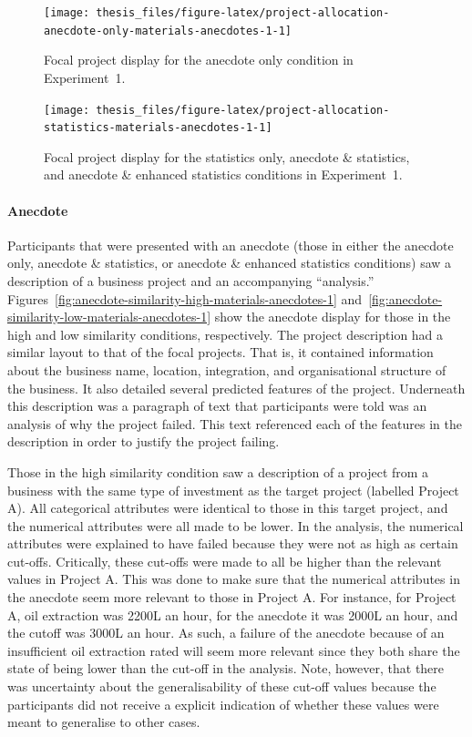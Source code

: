 \documentclass[a4paper, nobind, dvipsnames]{templates/ociamthesis}
\theoremstyle{definition}
\theoremstyle{definition}
\theoremstyle{definition}
\theoremstyle{definition}
\theoremstyle{remark}
\begin{document}
\begin{figure}
\texttt{[image: thesis\_files/figure-latex/project-allocation-anecdote-only-materials-anecdotes-1-1]} \caption{Focal project display for the anecdote only condition in Experiment~1.}\label{fig:project-allocation-anecdote-only-materials-anecdotes-1}
\end{figure}



\begin{figure}
\texttt{[image: thesis\_files/figure-latex/project-allocation-statistics-materials-anecdotes-1-1]} \caption{Focal project display for the statistics only, anecdote \& statistics, and anecdote \& enhanced statistics conditions in Experiment~1.}\label{fig:project-allocation-statistics-materials-anecdotes-1}
\end{figure}

\paragraph{Anecdote}

Participants that were presented with an anecdote (those in either the anecdote
only, anecdote \& statistics, or anecdote \& enhanced statistics conditions) saw a
description of a business project and an accompanying ``analysis.''
Figures~\ref{fig:anecdote-similarity-high-materials-anecdotes-1}
and~\ref{fig:anecdote-similarity-low-materials-anecdotes-1} show the anecdote
display for those in the high and low similarity conditions, respectively. The
project description had a similar layout to that of the focal projects. That is,
it contained information about the business name, location, integration, and
organisational structure of the business. It also detailed several predicted
features of the project. Underneath this description was a paragraph of text
that participants were told was an analysis of why the project failed. This text
referenced each of the features in the description in order to justify the
project failing.

Those in the high similarity condition saw a description of a project from a
business with the same type of investment as the target project (labelled
Project A). All categorical attributes were identical to those in this target
project, and the numerical attributes were all made to be lower. In the
analysis, the numerical attributes were explained to have failed because they
were not as high as certain cut-offs. Critically, these cut-offs were made to
all be higher than the relevant values in Project A. This was done to make sure
that the numerical attributes in the anecdote seem more relevant to those in
Project A. For instance, for Project A, oil extraction was 2200L an hour, for
the anecdote it was 2000L an hour, and the cutoff was 3000L an hour. As such, a
failure of the anecdote because of an insufficient oil extraction rated will
seem more relevant since they both share the state of being lower than the
cut-off in the analysis. Note, however, that there was uncertainty about the
generalisability of these cut-off values because the participants did not
receive a explicit indication of whether these values were meant to generalise
to other cases.
\end{document}
